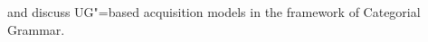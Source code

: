 \citet{Briscoe2000a} and \citet{Villavicencio2002a} discuss UG"=based acquisition models in the framework of Categorial Grammar.






